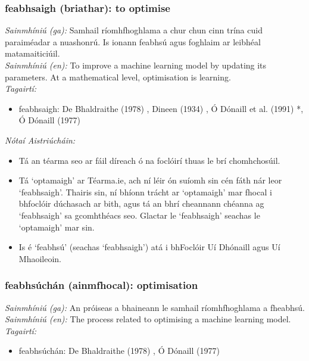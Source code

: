 \subsubsection*{feabhsaigh (briathar): to optimise}
 \noindent \textit{Sainmhíniú (ga):} Samhail ríomhfhoghlama a chur chun cinn trína cuid paraiméadar a nuashonrú. Is ionann feabhsú agus foghlaim ar leibhéal matamaiticiúil.
\\
 \noindent \textit{Sainmhíniú (en):} To improve a machine learning model by updating its parameters. At a mathematical level, optimisation is learning.
\\
 \noindent \textit{Tagairtí:}
\begin{itemize}
	\item feabhsaigh: De Bhaldraithe (1978) \cite{de-bhaldraithe}, Dineen (1934) \cite{dineen}, Ó Dónaill et al. (1991) \cite{focloir-beag}*, Ó Dónaill (1977) \cite{odonaill}
\end{itemize}

 \noindent \textit{Nótaí Aistriúcháin:}
\begin{itemize}
	\item Tá an téarma seo ar fáil díreach ó na foclóirí thuas le brí chomhchosúil.
	\item Tá `optamaigh' ar Téarma.ie, ach ní léir ón suíomh sin cén fáth nár leor `feabhsaigh'. Thairis sin, ní bhíonn trácht ar `optamaigh' mar fhocal i bhfoclóir dúchasach ar bith, agus tá an bhrí cheannann chéanna ag `feabhsaigh' sa gcomhthéacs seo. Glactar le `feabhsaigh' seachas le `optamaigh' mar sin.
	\item Is é `feabhsú' (seachas `feabhsaigh') atá i bhFoclóir Uí Dhónaill agus Uí Mhaoileoin.
\end{itemize}


\subsubsection*{feabhsúchán (ainmfhocal): optimisation}
 \noindent \textit{Sainmhíniú (ga):} An próiseas a bhaineann le samhail ríomhfhoghlama a fheabhsú.
\\
 \noindent \textit{Sainmhíniú (en):} The process related to optimising a machine learning model.
\\
 \noindent \textit{Tagairtí:}
\begin{itemize}
	\item feabhsúchán: De Bhaldraithe (1978) \cite{de-bhaldraithe}, Ó Dónaill (1977) \cite{odonaill}
\end{itemize}

